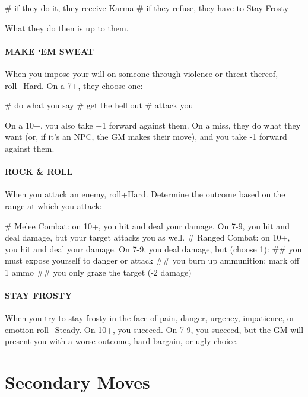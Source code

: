 \begin{easylist}
    # if they do it, they receive Karma
    # if they refuse, they have to Stay Frosty 
\end{easylist}

What they do then is up to them.


\paragraph{MAKE ‘EM SWEAT}
When you impose your will on someone through violence or threat thereof, roll+Hard. On a 7+, they choose one:

\begin{easylist}
    # do what you say
    # get the hell out
    # attack you
\end{easylist}

On a 10+, you also take +1 forward against them. On a miss, they do what they want (or, if it’s an NPC, the GM makes their move), and you take -1 forward against them.


\paragraph{ROCK \& ROLL}
When you attack an enemy, roll+Hard. Determine the outcome based on the range at which you attack:

\begin{easylist}
    # Melee Combat: on 10+, you hit and deal your damage. On 7-9, you hit and deal damage, but your target attacks you as well.
    # Ranged Combat: on 10+, you hit and deal your damage. On 7-9, you deal damage, but (choose 1):
    ## you must expose yourself to danger or attack
    ## you burn up ammunition; mark off 1 ammo
    ## you only graze the target (-2 damage)
\end{easylist}


\paragraph{STAY FROSTY}
When you try to stay frosty in the face of pain, danger, urgency, impatience, or emotion roll+Steady. On 10+, you succeed. On 7-9, you succeed, but the GM will present you with a worse outcome, hard bargain, or ugly choice.



\section{Secondary Moves}

